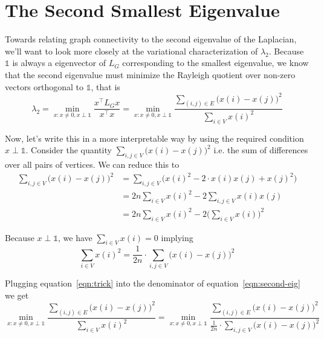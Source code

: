 \section{The Second Smallest Eigenvalue}

Towards relating graph connectivity to the second eigenvalue of the Laplacian, we'll want to look more closely at the variational characterization of $\lambda_2$. Because $\mathbb{1}$ is always a eigenvector of $L_G$ corresponding to the smallest eigenvalue, we know that the second eigenvalue must minimize the Rayleigh quotient over non-zero vectors orthogonal to $\mathbb{1}$, that is
\begin{equation}\label{eqn:second-eig}
  \lambda_2
  = \min_{x : x \neq 0, x \perp \mathbb{1}} \frac{x^\top L_G x}{x^\top x}
  = \min_{x : x \neq 0, x \perp \mathbb{1}} \frac{\sum_{(i, j) \in E} \big( x(i) - x(j) \big)^2}{\sum_{i \in V} x(i)^2}
\end{equation}

Now, let's write this in a more interpretable way by using the required condition $x \perp \mathbb{1}$. Consider the quantity $\sum_{i, j \in V} \big( x(i) - x(j) \big)^2$ i.e. the sum of differences over all pairs of vertices. We can reduce this to
\begin{align*}
\sum_{i, j \in V} \big( x(i) - x(j) \big)^2
&= \sum_{i, j \in V} \big( x(i)^2 - 2 \cdot x(i) x(j) + x(j)^2 \big) \\
&= 2n \sum_{i \in V} x(i)^2 - 2 \sum_{i, j \in V} x(i) x(j) \\
&= 2n \sum_{i \in V} x(i)^2 - 2 \bigg( \sum_{i \in V} x(i) \bigg)^2
\end{align*}

Because $x \perp \mathbb{1}$, we have $\sum_{i \in V} x(i) = 0$ implying
\begin{equation}\label{eqn:trick}
\sum_{i \in V} x(i)^2 = \frac{1}{2n} \cdot \sum_{i, j \in V} \big( x(i) - x(j) \big)^2
\end{equation}

Plugging equation~\ref{eqn:trick} into the denominator of equation~\ref{eqn:second-eig} we get
\begin{equation*}
\min_{x : x \neq 0, x \perp \mathbb{1}}
  \frac{\sum_{(i, j) \in E} \big( x(i) - x(j) \big)^2}{\sum_{i \in V} x(i)^2}
= \min_{x : x \neq 0, x \perp \mathbb{1}}
  \frac{\sum_{(i, j) \in E} \big( x(i) - x(j) \big)^2}{\frac{1}{2n} \cdot \sum_{i, j \in V} \big( x(i) - x(j) \big)^2}
\end{equation*}

